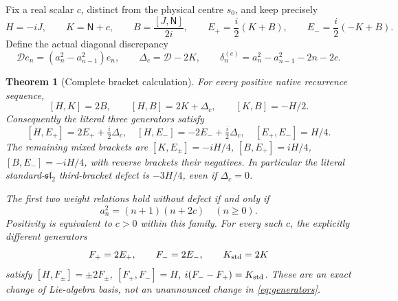 \documentclass[11pt]{article}
\newtheorem{theorem}{Theorem}[section]
\begin{document}
Fix a real scalar $c$, distinct from the physical centre $s_0$,
and keep precisely
\begin{equation}\label{eq:generators}
 H=-iJ,\qquad K=\mathsf N+c,\qquad
 B=\frac{[J,\mathsf N]}{2i},\qquad
 E_+=\frac i2(K+B),\qquad E_-=\frac i2(-K+B).
\end{equation}
Define the actual diagonal discrepancy
\begin{equation}\label{eq:delta}
 \mathcal D e_n=(a_n^2-a_{n-1}^2)e_n,\qquad
 \Delta_c=\mathcal D-2K,\qquad
 \delta_n^{(c)}=a_n^2-a_{n-1}^2-2n-2c.
\end{equation}

\begin{theorem}[Complete bracket calculation]\label{thm:brackets}
For every positive native recurrence sequence,
\begin{equation}\label{eq:basicbrackets}
 [H,K]=2B,\qquad [H,B]=2K+\Delta_c,\qquad [K,B]=-H/2.
\end{equation}
Consequently the literal three generators satisfy
\begin{equation}\label{eq:literalbrackets}
 \boxed{
 [H,E_+]=2E_++\tfrac i2\Delta_c,\quad
 [H,E_-]=-2E_-+\tfrac i2\Delta_c,\quad
 [E_+,E_-]=H/4.}
\end{equation}
The remaining mixed brackets are
$[K,E_\pm]=-iH/4$, $[B,E_+]=iH/4$,
$[B,E_-]=-iH/4$, with reverse brackets their negatives.
In particular the literal standard-$\mathfrak{sl}_2$
third-bracket defect is $-3H/4$, even if $\Delta_c=0$.

The first two weight relations hold without defect if and only if
\begin{equation}\label{eq:allc}
 a_n^2=(n+1)(n+2c)\quad(n\geq0).
\end{equation}
Positivity is equivalent to $c>0$ within this family.
For every such $c$, the explicitly different generators
\begin{equation}\label{eq:morphism}
 F_+=2E_+,\qquad F_-=2E_-,\qquad K_{\rm std}=2K
\end{equation}
satisfy
$[H,F_\pm]=\pm2F_\pm$, $[F_+,F_-]=H$,
$i(F_--F_+)=K_{\rm std}$.
These are an exact change of Lie-algebra basis, not an
unannounced change in \eqref{eq:generators}.
\end{theorem}
\end{document}
